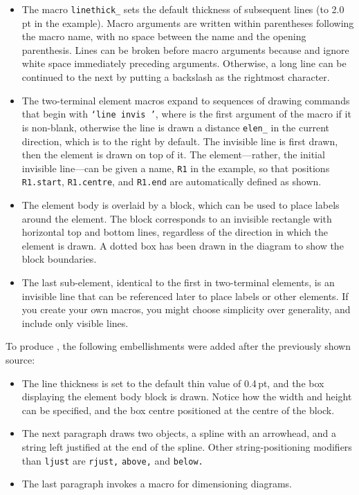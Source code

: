 \begin{itemize}
\item The macro {\tt linethick\_} sets the default thickness of subsequent
   lines (to 2.0\,pt in the example).
   Macro arguments are written within parentheses
   following the macro name, with no space between the name and the
   opening parenthesis.  Lines can be broken before macro arguments
   because \Mfour and \dpic ignore white space immediately preceding
   arguments.  Otherwise, a long line can be continued to the next
   by putting a backslash as the rightmost character. 
\item The two-terminal element macros expand to sequences of drawing commands
   that begin with {\tt `line invis \linespec'},
   where \linespec is the first argument of the macro if it
   is non-blank, otherwise the line is drawn a distance
   {\tt elen\_} in the current direction, which is to the right by
   default.
   The invisible line is first drawn, then the element is drawn
   on top of it.
   The element---rather, the initial invisible line---can
   be given a name, {\tt R1} in the example, so that positions
   {\tt R1.start}, {\tt R1.centre}, and {\tt R1.end} are automatically
   defined as shown.
\item The element body is overlaid by a block, which can be
   used to place labels around the element.  The block
   corresponds to an invisible rectangle with horizontal top and bottom lines,
   regardless of the direction in which the element is drawn.  A
   dotted box has been drawn in the diagram to show the block boundaries.
\item The last sub-element, identical to the first in two-terminal
   elements, is an invisible line that can be referenced later to
   place labels or other elements.
   If you create your own macros, you might choose simplicity over generality,
   and include only visible lines.
  \end{itemize}

To produce , the following embellishments
were added after the previously shown source:
{\small  }

\begin{itemize}
\item The line thickness is set to the default thin value of \hbox{0.4\,pt},
   and the box displaying the element body block is drawn.  Notice how the
   width and height can be specified, and the box centre positioned at
   the centre of the block.
\item The next paragraph draws two objects, a spline with an arrowhead,
   and a string left justified at the end of the spline.  Other
   string-positioning modifiers than {\tt ljust} are {\tt rjust,}
   {\tt above,} and {\tt below.}

\item The last paragraph invokes a macro for dimensioning diagrams.
   \end{itemize}

